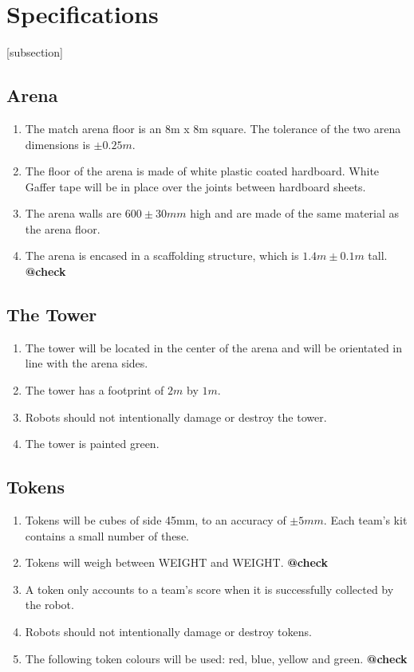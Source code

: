 \section{Specifications}
[subsection]
\newcommand{\rcnii}{\stepcounter{rulei}\arabic{section}.\arabic{subsection}.\arabic{rulei}}
\renewcommand{\labelenumi}{\rcnii}

\subsection{Arena}
\begin{enumerate}
\item The match arena floor is an 8m x 8m square.
 The tolerance of the two arena dimensions is $\pm0.25m$.
\item The floor of the arena is made of white plastic coated hardboard.
 White Gaffer tape will be in place over the joints between hardboard sheets.
\item The arena walls are $600\pm30mm$ high and are made of the same material as the arena floor.
\item The arena is encased in a scaffolding structure, which is $1.4m \pm0.1m$ tall.	\textbf{@check}
\end{enumerate}

\subsection{The Tower}
\label{tower}
\begin {enumerate} 
\item The tower will be located in the center of the arena and will be orientated in line with the arena sides.
\item The tower has a footprint of $2m$ by $1m$.
\item Robots should not intentionally damage or destroy the tower.
\item The tower is painted green.
\end {enumerate}

\subsection{Tokens}
\label{tokens}
\begin {enumerate} 
\item Tokens will be cubes of side 45mm, to an accuracy of $\pm5mm$.
 Each team's kit contains a small number of these.
\item Tokens will weigh between WEIGHT and WEIGHT.	\textbf{@check}
\item A token only accounts to a team's score when it is successfully collected by the robot.
\item Robots should not intentionally damage or destroy tokens.
\item The following token colours will be used: red, blue, yellow and green.	\textbf{@check}
\end {enumerate}

